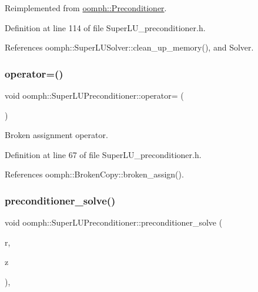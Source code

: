 Reimplemented from \hyperlink{classoomph_1_1Preconditioner_a46c31c416829bedcd9db238431262027}{oomph\+::\+Preconditioner}.



Definition at line 114 of file Super\+L\+U\+\_\+preconditioner.\+h.



References oomph\+::\+Super\+L\+U\+Solver\+::clean\+\_\+up\+\_\+memory(), and Solver.

\mbox{\label{classoomph_1_1SuperLUPreconditioner_a3adff07af5fd101787ee1721a65f9a7c}} 
\subsubsection{\texorpdfstring{operator=()}{operator=()}}
{\footnotesize\ttfamily void oomph\+::\+Super\+L\+U\+Preconditioner\+::operator= (\begin{DoxyParamCaption}\item[{const \hyperlink{classoomph_1_1SuperLUPreconditioner}{Super\+L\+U\+Preconditioner} \&}]{ }\end{DoxyParamCaption})\hspace{0.3cm}{\ttfamily [inline]}}



Broken assignment operator. 



Definition at line 67 of file Super\+L\+U\+\_\+preconditioner.\+h.



References oomph\+::\+Broken\+Copy\+::broken\+\_\+assign().

\mbox{\label{classoomph_1_1SuperLUPreconditioner_a687a7578834939a5ca70bd4871189ad0}} 
\subsubsection{\texorpdfstring{preconditioner\+\_\+solve()}{preconditioner\_solve()}}
{\footnotesize\ttfamily void oomph\+::\+Super\+L\+U\+Preconditioner\+::preconditioner\+\_\+solve (\begin{DoxyParamCaption}\item[{const \hyperlink{classoomph_1_1DoubleVector}{Double\+Vector} \&}]{r,  }\item[{\hyperlink{classoomph_1_1DoubleVector}{Double\+Vector} \&}]{z }\end{DoxyParamCaption})\hspace{0.3cm}{\ttfamily [inline]}, {\ttfamily [virtual]}}



